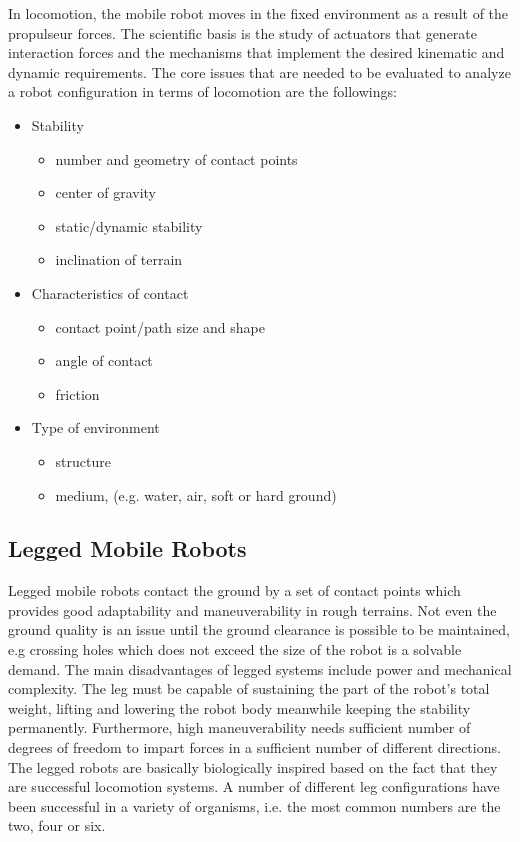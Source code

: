 \documentclass[12pt,english,twoside]{article}
\begin{document}
In locomotion, the mobile robot moves in the fixed environment as a result of the propulseur forces. The scientific basis is the study of actuators that generate interaction forces and the mechanisms that implement the desired kinematic and dynamic requirements. The core issues that are needed to be evaluated to analyze a robot configuration in terms of locomotion are the followings: \cite{sieg}
\begin{itemize}
	\item Stability
		\begin{itemize}
			\item number and geometry of contact points
			\item center of gravity
			\item static/dynamic stability
			\item inclination of terrain
		\end{itemize}
	\item Characteristics of contact
		\begin{itemize}
			\item contact point/path size and shape
			\item angle of contact
			\item friction
		\end{itemize}
	\item Type of environment
	\begin{itemize}
		\item structure
		\item medium, (e.g. water, air, soft or hard ground)
	\end{itemize}

\end{itemize}


\subsection{Legged Mobile Robots}
Legged mobile robots contact the ground by a set of contact points which provides good adaptability and maneuverability in rough terrains. Not even the ground quality is an issue until the ground clearance is possible to be maintained, e.g crossing holes which does not exceed the size of the robot is a solvable demand. The main disadvantages of legged systems include power and mechanical complexity. The leg must be capable of sustaining the part of the robot’s total weight, lifting and lowering the robot body meanwhile keeping the stability permanently. Furthermore, high maneuverability needs sufficient number of degrees of freedom to impart forces in a sufficient number of different directions.
The legged robots are basically biologically inspired based on the fact that they are successful locomotion systems. A number of different leg configurations have been successful in a variety of organisms, i.e. the most common numbers are the two, four or six.
\end{document}
